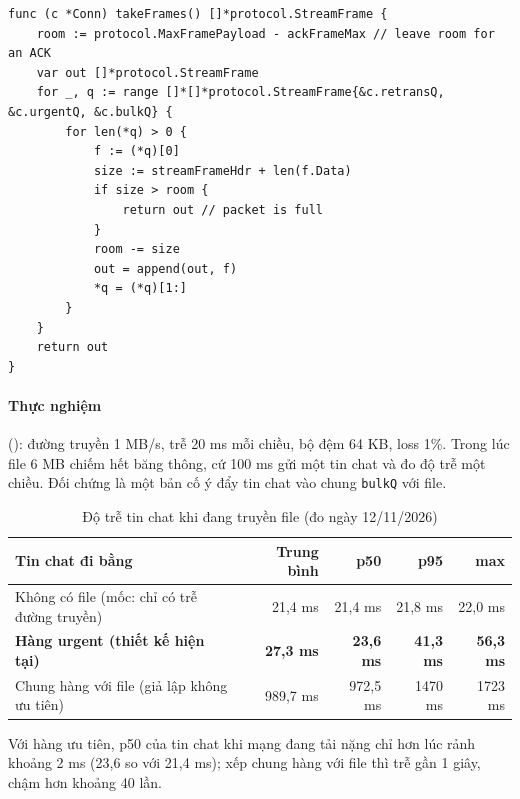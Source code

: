 \begin{lstlisting}[caption={Lấy frame cho một gói theo thứ tự ưu tiên (\fname{conn.go}, rút gọn)},
  label=lst:takeframes]
func (c *Conn) takeFrames() []*protocol.StreamFrame {
	room := protocol.MaxFramePayload - ackFrameMax // leave room for an ACK
	var out []*protocol.StreamFrame
	for _, q := range []*[]*protocol.StreamFrame{&c.retransQ, &c.urgentQ, &c.bulkQ} {
		for len(*q) > 0 {
			f := (*q)[0]
			size := streamFrameHdr + len(f.Data)
			if size > room {
				return out // packet is full
			}
			room -= size
			out = append(out, f)
			*q = (*q)[1:]
		}
	}
	return out
}
\end{lstlisting}

\paragraph{Thực nghiệm} (): đường truyền 1 MB/s, trễ 20 ms mỗi chiều, bộ đệm 64 KB, loss 1\%.
Trong lúc file 6 MB chiếm hết băng thông, cứ 100 ms gửi một tin chat và đo độ trễ một chiều. Đối chứng là một bản
cố ý đẩy tin chat vào chung \texttt{bulkQ} với file.

\begin{table}[H]
  \centering
  \caption{Độ trễ tin chat khi đang truyền file (đo ngày 12/11/2026)}
  \label{tab:hol}
  \small
  \begin{tabularx}{\linewidth}{Yrrrr}
    \toprule
    \textbf{Tin chat đi bằng} & \textbf{Trung bình} & \textbf{p50} & \textbf{p95} & \textbf{max} \\
    \midrule
    Không có file (mốc: chỉ có trễ đường truyền) & 21,4 ms & 21,4 ms & 21,8 ms & 22,0 ms \\
    \textbf{Hàng urgent (thiết kế hiện tại)} & \textbf{27,3 ms} & \textbf{23,6 ms} & \textbf{41,3 ms} &
    \textbf{56,3 ms} \\
    Chung hàng với file (giả lập không ưu tiên) & 989,7 ms & 972,5 ms & 1470 ms & 1723 ms \\
    \bottomrule
  \end{tabularx}
\end{table}

Với hàng ưu tiên, p50 của tin chat khi mạng đang tải nặng chỉ hơn lúc rảnh khoảng 2 ms (23,6 so với 21,4 ms);
xếp chung hàng với file thì trễ gần 1 giây, chậm hơn khoảng 40 lần.
